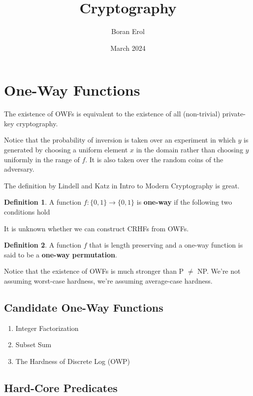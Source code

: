 \documentclass{article}
\title{Cryptography}
\date{March 2024}
\author{Boran Erol}
\theoremstyle{definition}
\newtheorem{definition}{Definition}
\begin{document}
\maketitle

\section{One-Way Functions}

The existence of OWFs is equivalent to the existence of all (non-trivial) private-key
cryptography.

Notice that the probability of inversion is taken over an experiment in which $y$ is
generated by choosing a uniform element $x$ in the domain rather than choosing $y$
uniformly in the range of $f$. It is also taken over the random coins of the
adversary.

The definition by Lindell and Katz in Intro to Modern Cryptography is great.

\begin{definition}
    A function $f: \{0,1\} \xrightarrow{} \{0,1\}$ is \textbf{one-way} if the following two conditions hold

\end{definition}

It is unknown whether we can construct CRHFs from OWFs.

\begin{definition}
    A function $f$ that is length preserving and a one-way function is said to be
    a \textbf{one-way permutation}.
\end{definition}

Notice that the existence of OWFs is much stronger than P $\neq$ NP. We're not assuming
worst-case hardness, we're assuming average-case hardness.



\subsection{Candidate One-Way Functions}

\begin{enumerate}
    \item Integer Factorization
    \item Subset Sum
    \item The Hardness of Discrete Log (OWP)
\end{enumerate}

\subsection{Hard-Core Predicates}
\end{document}
